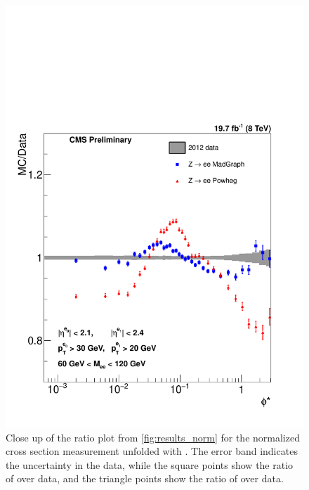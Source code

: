 \begin{figure}[!p]
    \centering
    \includegraphics[width=\textwidth]{figures/ZShape_Ratioelec_Norm_Dressed.pdf}
    \caption[
        Close up of the ratio plot from \cref{fig:results_norm} for the
        normalized cross section measurement unfolded with \MADGRAPH.
    ]{
        Close up of the ratio plot from \cref{fig:results_norm} for the
        normalized cross section measurement unfolded with \MADGRAPH. The error
        band indicates the uncertainty in the data, while the square points
        show the ratio of \MADGRAPH over data, and the triangle points show the
        ratio of \POWHEG over data.
    }
    \label{fig:results_ratio_norm}
\end{figure}

